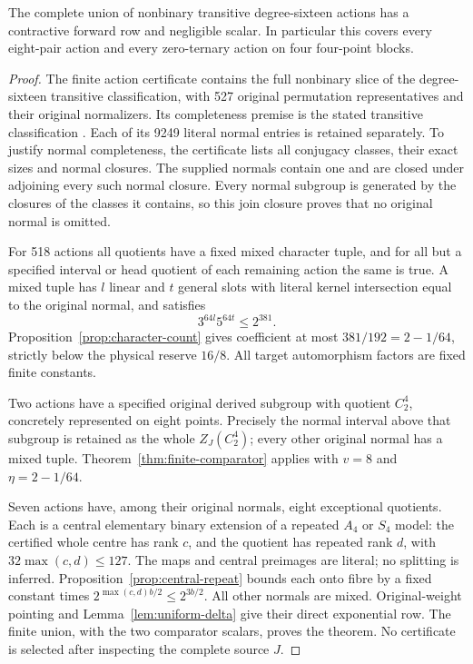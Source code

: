 \begin{theorem}
\label{thm:degree-sixteen-nonbinary}
The complete union of nonbinary transitive degree-sixteen actions
has a contractive forward row and negligible scalar. In particular
this covers every eight-pair action and every zero-ternary action
on four four-point blocks.
\end{theorem}
\begin{proof}
The finite action certificate contains the full nonbinary slice of
the degree-sixteen transitive classification, with 527 original
permutation representatives and their original normalizers. Its
completeness premise is the stated transitive classification
\cite{Hulpke2005,TransGrp365}. Each of its 9249 literal normal
entries is retained separately. To justify normal completeness,
the certificate lists all conjugacy classes, their exact sizes
and normal closures. The supplied normals contain one and are
closed under adjoining every such normal closure. Every normal
subgroup is generated by the closures of the classes it contains,
so this join closure proves that no original normal is omitted.

For 518 actions all quotients have a fixed mixed character tuple,
and for all but a specified interval or head quotient of each
remaining action the same is true. A mixed tuple has $l$ linear
and $t$ general slots with literal kernel intersection equal to
the original normal, and satisfies
\[
 3^{64l}5^{64t}\leq2^{381}.
\]
Proposition~\ref{prop:character-count} gives coefficient at most
$381/192=2-1/64$, strictly below the physical reserve $16/8$.
All target automorphism factors are fixed finite constants.

Two actions have a specified original derived subgroup with
quotient $C_2^4$, concretely represented on eight points. Precisely
the normal interval above that subgroup is retained as the whole
$Z_J(C_2^4)$; every other original normal has a mixed tuple.
Theorem~\ref{thm:finite-comparator} applies with $v=8$ and
$\eta=2-1/64$.

Seven actions have, among their original normals, eight exceptional
quotients. Each is a central elementary binary extension of a
repeated $A_4$ or $S_4$ model: the certified whole centre has
rank $c$, and the quotient has repeated rank $d$, with
$32\max(c,d)\leq127$. The maps and central preimages are literal;
no splitting is inferred. Proposition~\ref{prop:central-repeat}
bounds each onto fibre by a fixed constant times
$2^{\max(c,d)b/2}\leq2^{3b/2}$. All other normals are mixed.
Original-weight pointing and Lemma~\ref{lem:uniform-delta} give
their direct exponential row. The finite union, with the two
comparator scalars, proves the theorem. No certificate is selected
after inspecting the complete source $J$.
\end{proof}

